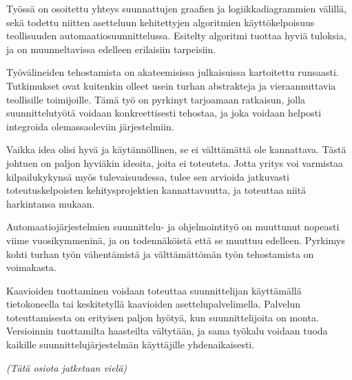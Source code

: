 \documentclass[finnish,12pt]{article}
\begin{document}
Työssä on osoitettu yhteys suunnattujen graafien ja logiikkadiagrammien välillä, sekä todettu niitten asetteluun kehitettyjen algoritmien käyttökelpoisuus teollisuuden automaatiosuunnittelussa.
Esitelty algoritmi tuottaa hyviä tuloksia, ja on muunneltavissa edelleen erilaisiin tarpeisiin.

Työvälineiden tehostamista on akateemisissa julkaisuissa kartoitettu runsaasti.
Tutkimukset ovat kuitenkin olleet usein turhan abstrakteja ja vieraannuttavia teollisille toimijoille.
Tämä työ on pyrkinyt tarjoamaan ratkaisun, jolla suunnittelutyötä voidaan konkreettisesti tehostaa, ja joka voidaan helposti integroida olemassaoleviin järjestelmiin.

Vaikka idea olisi hyvä ja käytännöllinen, se ei välttämättä ole kannattava.
Tästä johtuen on paljon hyviäkin ideoita, joita ei toteuteta.
Jotta yritys voi varmistaa kilpailukykynsä myös tulevaisuudessa, tulee sen arvioida jatkuvasti toteutuskelpoisten kehitysprojektien kannattavuutta, ja toteuttaa niitä harkintansa mukaan.

Automaatiojärjestelmien suunnittelu- ja ohjelmointityö on muuttunut nopeasti viime vuosikymmeninä, ja on todennäköistä että se muuttuu edelleen.
Pyrkimys kohti turhan työn vähentämistä ja välttämättömän työn tehostamista on voimakasta.

Kaavioiden tuottaminen voidaan toteuttaa suunnittelijan käyttämällä tietokoneella tai keskitetyllä kaavioiden asettelupalvelimella.
Palvelun toteuttamisesta on erityisen paljon hyötyä, kun suunnittelijoita on monta.
Versioinnin tuottamilta haasteilta vältytään, ja sama työkalu voidaan tuoda kaikille suunnittelujärjestelmän käyttäjille 
yhdenaikaisesti.

\emph{(Tätä osiota jatketaan vielä)}

\clearpage
{}


\end{document}
